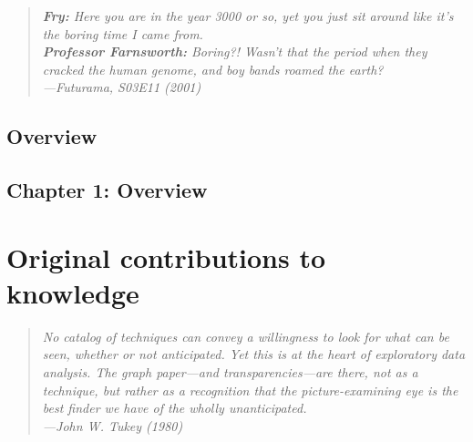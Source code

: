 \documentclass[12pt, TexShade, letterpaper]{report}
\makeatletter
\newcommand{\unchapter}[1]{%
  \begingroup
  \let\@makechapterhead\@gobble %
  \chapter{#1}
  \endgroup
}
\makeatother
\begin{document}
\begin{center}
\begin{quote} 
\begin{singlespace}
\textit{
\textbf{Fry:} Here you are in the year 3000 or so, yet you just sit around like it's the boring time I came from.\\
\textbf{Professor Farnsworth:} Boring?! Wasn't that the period when they cracked the human genome, and boy bands roamed the earth? \\
---Futurama, S03E11 (2001)}
\end{singlespace}
\end{quote}
\end{center}

\vfill
\hspace{0pt}
\pagebreak

\unchapter{Overview}
\chapter*{Chapter 1: Overview}


%
%

\part{Original contributions to knowledge}
\label{part:manuscripts}

\pagebreak
\hspace{0pt}
\vfill

\begin{center}
\begin{quote} 
\begin{singlespace}
\textit{No catalog of techniques can convey a willingness to look for what can be seen, whether or not anticipated. Yet this is at the heart of exploratory data analysis. The graph paper---and transparencies---are there, not as a technique, but rather as a recognition that the picture-examining eye is the best finder we have of the wholly unanticipated. \\
---John W. Tukey (1980)}
\end{singlespace}
\end{quote}
\end{center}

\vfill
\hspace{0pt}
\pagebreak
\end{document}
